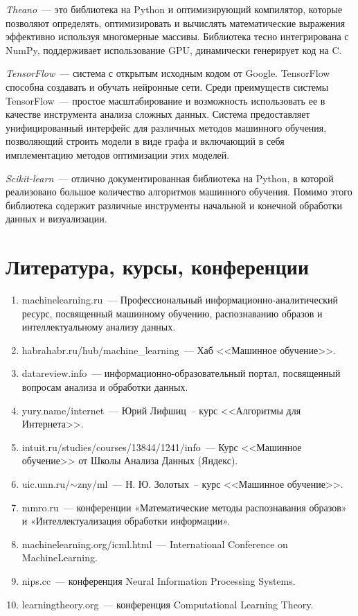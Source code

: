 \emph{Theano}~--- это библиотека на Python и оптимизирующий компилятор, которые позволяют определять,
оптимизировать и вычислять математические выражения эффективно используя многомерные массивы. Библиотека
тесно интегрирована с NumPy, поддерживает использование GPU, динамически генерирует код на C.

\emph{TensorFlow}~--- система с открытым исходным кодом от Google. TensorFlow способна создавать и
обучать нейронные сети. Среди преимуществ системы TensorFlow~--- простое масштабирование и возможность
использовать ее в качестве инструмента анализа сложных данных. Система предоставляет унифицированный
интерфейс для различных методов машинного обучения, позволяющий строить модели в виде графа и
включающий в себя имплементацию методов оптимизации этих моделей.

\emph{Scikit-learn}~--- отлично документированная библиотека на Python, в которой реализовано большое
количество алгоритмов машинного обучения. Помимо этого библиотека содержит различные инструменты
начальной и конечной обработки данных и визуализации.

\chapter{Литература, курсы, конференции}
\begin{enumerate}
  \item machinelearning.ru~--- Профессиональный информационно-аналитический ресурс, посвященный машинному
    обучению, распознаванию образов и интеллектуальному анализу данных.
  \item habrahabr.ru/hub/machine\_learning~--- Хаб <<Машинное обучение>>.
  \item datareview.info~--- информационно-образовательный портал, посвященный вопросам анализа и
    обработки данных.
  \item yury.name/internet~--- Юрий Лифшиц~-- курс <<Алгоритмы для Интернета>>.
  \item intuit.ru/studies/courses/13844/1241/info~--- Курс <<Машинное обучение>> от Школы Анализа
    Данных (Яндекс).
  \item uic.unn.ru/\( \sim \)zny/ml~--- Н. Ю. Золотых~-- курс 	
<<Машинное обучение>>.
  \item mmro.ru~--- конференции «Математические методы распознавания образов» и «Интеллектуализация
    обработки информации».
  \item machinelearning.org/icml.html~--- International Conference on Machine\linebreak Learning.
  \item nips.cc~--- конференция Neural Information Processing Systems.
  \item learningtheory.org~--- конференция Computational Learning Theory.
\end{enumerate}

